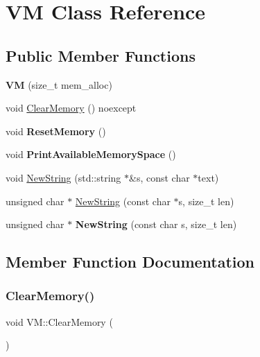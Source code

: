 \hypertarget{class_v_m}{}\section{VM Class Reference}
\label{class_v_m}
\subsection*{Public Member Functions}
\begin{DoxyCompactItemize}
\item 
\mbox{\label{class_v_m_a1e35950311fcd5b979826a88a70b2ff1}} 
{\bfseries VM} (size\+\_\+t mem\+\_\+alloc)
\item 
void \mbox{\hyperlink{class_v_m_a3ecb3c0ac60913fce9265075cff13b3e}{Clear\+Memory}} () noexcept
\item 
\mbox{\label{class_v_m_a27c2abea1a473e46a715461a7398ab52}} 
void {\bfseries Reset\+Memory} ()
\item 
\mbox{\label{class_v_m_af9c967a1c85e41be6eb199f3cc44000b}} 
void {\bfseries Print\+Available\+Memory\+Space} ()
\item 
void \mbox{\hyperlink{class_v_m_a96ac4af79fb5e5fa9c168ffe0bd8a8a7}{New\+String}} (std\+::string $\ast$\&s, const char $\ast$text)
\item 
unsigned char $\ast$ \mbox{\hyperlink{class_v_m_ae9bb9435ff87b17b9a2103a4fbaa526f}{New\+String}} (const char $\ast$s, size\+\_\+t len)
\item 
\mbox{\label{class_v_m_a03cc83d83a3cd9bfc45d7d5315506542}} 
unsigned char $\ast$ {\bfseries New\+String} (const char s, size\+\_\+t len)
\end{DoxyCompactItemize}


\subsection{Member Function Documentation}
\mbox{\label{class_v_m_a3ecb3c0ac60913fce9265075cff13b3e}} 
\subsubsection{\texorpdfstring{ClearMemory()}{ClearMemory()}}
{\footnotesize\ttfamily void V\+M\+::\+Clear\+Memory (\begin{DoxyParamCaption}{ }\end{DoxyParamCaption})\hspace{0.3cm}{\ttfamily [noexcept]}}

